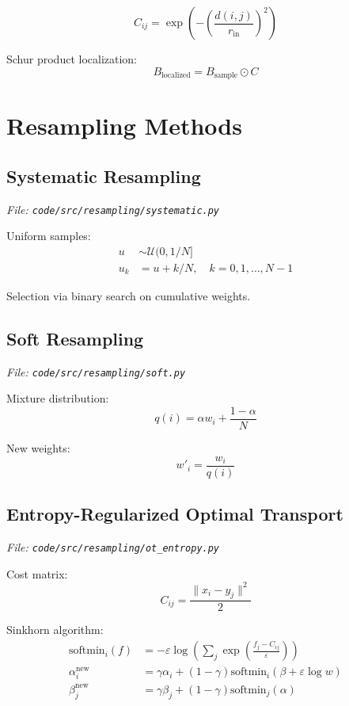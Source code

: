 \documentclass[12pt]{article}
\begin{document}
\begin{equation}
C_{ij} = \exp\left( -\left(\frac{d(i,j)}{r_{\text{in}}}\right)^2 \right)
\end{equation}

Schur product localization:
\begin{equation}
B_{\text{localized}} = B_{\text{sample}} \odot C
\end{equation}

\section{Resampling Methods}

\subsection{Systematic Resampling}
\textit{File: \texttt{code/src/resampling/systematic.py}}

Uniform samples:
\begin{align}
u &\sim \mathcal{U}(0, 1/N] \\
u_k &= u + k/N, \quad k = 0, 1, \ldots, N-1
\end{align}

Selection via binary search on cumulative weights.

\subsection{Soft Resampling}
\textit{File: \texttt{code/src/resampling/soft.py}}

Mixture distribution:
\begin{equation}
q(i) = \alpha w_i + \frac{1-\alpha}{N}
\end{equation}

New weights:
\begin{equation}
w'_i = \frac{w_i}{q(i)}
\end{equation}

\subsection{Entropy-Regularized Optimal Transport}
\textit{File: \texttt{code/src/resampling/ot\_entropy.py}}

Cost matrix:
\begin{equation}
C_{ij} = \frac{\|x_i - y_j\|^2}{2}
\end{equation}

Sinkhorn algorithm:
\begin{align}
\text{softmin}_i(f) &= -\varepsilon \log\left(\sum_j \exp\left(\frac{f_j - C_{ij}}{\varepsilon}\right)\right) \\
\alpha_i^{\text{new}} &= \gamma \alpha_i + (1-\gamma) \text{softmin}_i(\beta + \varepsilon \log w) \\
\beta_j^{\text{new}} &= \gamma \beta_j + (1-\gamma) \text{softmin}_j(\alpha)
\end{align}
\end{document}
